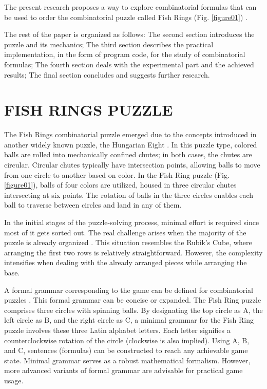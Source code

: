 \documentclass[a4paper,twocolumn,10pt]{article}
\begin{document}
The present research proposes a way to explore combinatorial formulas that can be used to order the combinatorial puzzle called Fish Rings (Fig. \ref{figure01}) \cite{Balabanov2015}.

The rest of the paper is organized as follows: The second section introduces the puzzle and its mechanics; The third section describes the practical implementation, in the form of program code, for the study of combinatorial formulas; The fourth section deals with the experimental part and the achieved results; The final section concludes and suggests further research.

\section{FISH RINGS PUZZLE}

The Fish Rings combinatorial puzzle emerged due to the concepts introduced in another widely known puzzle, the Hungarian Eight \cite{kornhauser1984coordinating}. In this puzzle type, colored balls are rolled into mechanically confined chutes; in both cases, the chutes are circular. Circular chutes typically have intersection points, allowing balls to move from one circle to another based on color. In the Fish Ring puzzle (Fig. \ref{figure01}), balls of four colors are utilized, housed in three circular chutes intersecting at six points. The rotation of balls in the three circles enables each ball to traverse between circles and land in any of them.

In the initial stages of the puzzle-solving process, minimal effort is required since most of it gets sorted out. The real challenge arises when the majority of the puzzle is already organized \cite{van2013complexity}. This situation resembles the Rubik's Cube, where arranging the first two rows is relatively straightforward. However, the complexity intensifies when dealing with the already arranged pieces while arranging the base.

A formal grammar corresponding to the game can be defined for combinatorial puzzles \cite{baral2011solving}. This formal grammar can be concise or expanded. The Fish Ring puzzle comprises three circles with spinning balls. By designating the top circle as A, the left circle as B, and the right circle as C, a minimal grammar \cite{lecomte1999towards} for the Fish Ring puzzle involves these three Latin alphabet letters. Each letter signifies a counterclockwise rotation of the circle (clockwise is also implied). Using A, B, and C, sentences (formulas) can be constructed to reach any achievable game state. Minimal grammar serves as a robust mathematical formalism. However, more advanced variants of formal grammar are advisable for practical game usage.
\end{document}
